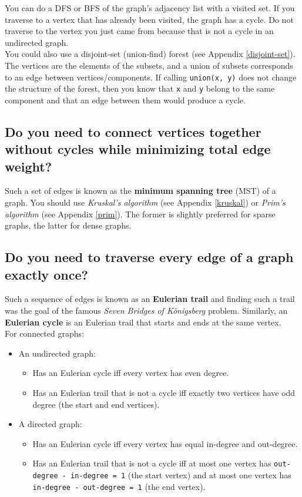 \documentclass[12pt, titlepage]{article}
\begin{document}
You can do a DFS or BFS of the graph's adjacency list with a visited set. If you traverse to a vertex that has already been visited, the graph has a cycle. Do not traverse to the vertex you just came from because that is not a cycle in an undirected graph. \\

You could also use a disjoint-set (union-find) forest (see Appendix \ref{disjoint-set}). The vertices are the elements of the subsets, and a union of subsets corresponds to an edge between vertices/components. If calling \texttt{union(x, y)} does not change the structure of the forest, then you know that \texttt{x} and \texttt{y} belong to the same component and that an edge between them would produce a cycle.

\subsection{Do you need to connect vertices together without cycles while minimizing total edge weight?}

Such a set of edges is known as the \textbf{minimum spanning tree} (MST) of a graph. You should use \textit{Kruskal's algorithm} (see Appendix \ref{kruskal}) or \textit{Prim's algorithm} (see Appendix \ref{prim}). The former is slightly preferred for sparse graphs, the latter for dense graphs.

\subsection{Do you need to traverse every edge of a graph exactly once?}

Such a sequence of edges is known as an \textbf{Eulerian trail} and finding such a trail was the goal of the famous \textit{Seven Bridges of K\"onigsberg} problem. Similarly, an \textbf{Eulerian cycle} is an Eulerian trail that starts and ends at the same vertex. \\

For connected graphs:
\begin{itemize}
  \item An undirected graph:
  \begin{itemize}
    \item Has an Eulerian cycle iff every vertex has even degree.
    \item Has an Eulerian trail that is not a cycle iff exactly two vertices have odd degree (the start and end vertices).
  \end{itemize}
  \item A directed graph:
  \begin{itemize}
    \item Has an Eulerian cycle iff every vertex has equal in-degree and out-degree.
    \item Has an Eulerian trail that is not a cycle iff at most one vertex has \texttt{out-degree - in-degree = 1} (the start vertex) and at most one vertex has \texttt{in-degree - out-degree = 1} (the end vertex). \medskip
  \end{itemize}
\end{itemize}
\end{document}
